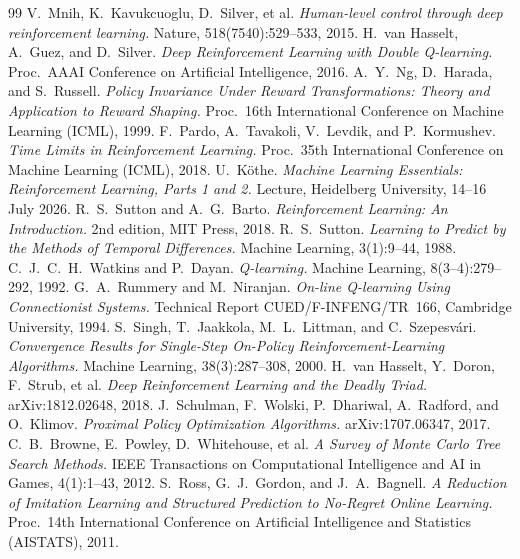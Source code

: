 \documentclass[11pt]{article}
\begin{document}
\begin{thebibliography}{99}
 V.~Mnih, K.~Kavukcuoglu, D.~Silver, et al.
  \emph{Human-level control through deep reinforcement learning.}
  Nature, 518(7540):529--533, 2015.
 H.~van Hasselt, A.~Guez, and D.~Silver.
  \emph{Deep Reinforcement Learning with Double Q-learning.}
  Proc.\ AAAI Conference on Artificial Intelligence, 2016.
 A.~Y.~Ng, D.~Harada, and S.~Russell.
  \emph{Policy Invariance Under Reward Transformations: Theory and Application to Reward
  Shaping.} Proc.\ 16th International Conference on Machine Learning (ICML), 1999.
 F.~Pardo, A.~Tavakoli, V.~Levdik, and P.~Kormushev.
  \emph{Time Limits in Reinforcement Learning.}
  Proc.\ 35th International Conference on Machine Learning (ICML), 2018.
 U.~K\"othe.
  \emph{Machine Learning Essentials: Reinforcement Learning, Parts 1 and 2.}
  Lecture, Heidelberg University, 14--16 July 2026.
 R.~S.~Sutton and A.~G.~Barto.
  \emph{Reinforcement Learning: An Introduction.}
  2nd edition, MIT Press, 2018.
 R.~S.~Sutton.
  \emph{Learning to Predict by the Methods of Temporal Differences.}
  Machine Learning, 3(1):9--44, 1988.
 C.~J.~C.~H.~Watkins and P.~Dayan.
  \emph{Q-learning.}
  Machine Learning, 8(3--4):279--292, 1992.
 G.~A.~Rummery and M.~Niranjan.
  \emph{On-line Q-learning Using Connectionist Systems.}
  Technical Report CUED/F-INFENG/TR~166, Cambridge University, 1994.
 S.~Singh, T.~Jaakkola, M.~L.~Littman, and C.~Szepesv\'ari.
  \emph{Convergence Results for Single-Step On-Policy Reinforcement-Learning Algorithms.}
  Machine Learning, 38(3):287--308, 2000.
 H.~van Hasselt, Y.~Doron, F.~Strub, et al.
  \emph{Deep Reinforcement Learning and the Deadly Triad.}
  arXiv:1812.02648, 2018.
 J.~Schulman, F.~Wolski, P.~Dhariwal, A.~Radford, and O.~Klimov.
  \emph{Proximal Policy Optimization Algorithms.}
  arXiv:1707.06347, 2017.
 C.~B.~Browne, E.~Powley, D.~Whitehouse, et al.
  \emph{A Survey of Monte Carlo Tree Search Methods.}
  IEEE Transactions on Computational Intelligence and AI in Games, 4(1):1--43, 2012.
 S.~Ross, G.~J.~Gordon, and J.~A.~Bagnell.
  \emph{A Reduction of Imitation Learning and Structured Prediction to No-Regret Online Learning.}
  Proc.\ 14th International Conference on Artificial Intelligence and Statistics (AISTATS), 2011.
 

\end{thebibliography}
\end{document}
